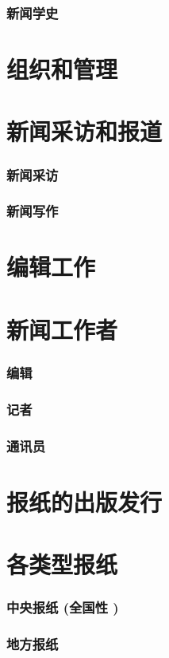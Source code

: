 \documentclass[UTF8]{../../ApplicationUniverse}
\begin{document}
    \subsubsection{新闻学史}
\section{组织和管理}
\section{新闻采访和报道}
    \subsubsection{新闻采访}
    \subsubsection{新闻写作}
\section{编辑工作}
\section{新闻工作者}
    \subsubsection{编辑}
    \subsubsection{记者}
    \subsubsection{通讯员}
\section{报纸的出版发行}
\section{各类型报纸}
    \subsubsection{中央报纸 (全国性 )}
    \subsubsection{地方报纸}
\end{document}
